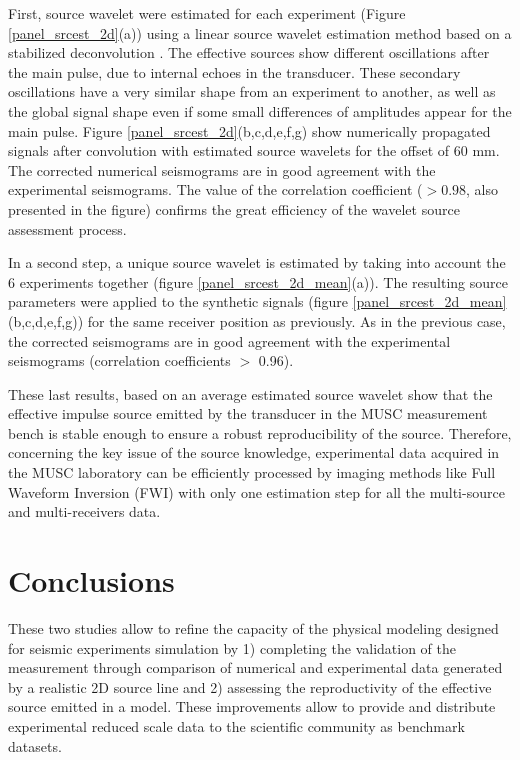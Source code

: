 \documentclass[manuscript,revised]{geophysics}
\begin{document}
\noindent First, source wavelet were estimated for each experiment (Figure \ref{panel_srcest_2d}(a)) using a linear source wavelet estimation method based on a stabilized deconvolution \citep{Pratt_FWI_1999}. The effective sources show different oscillations after the main pulse, due to internal echoes in the transducer. These secondary oscillations have a very similar shape from an experiment to another, as well as the global signal shape even if some small differences of amplitudes appear for the main pulse. Figure \ref{panel_srcest_2d}(b,c,d,e,f,g) show numerically propagated signals after convolution with estimated source wavelets for the offset of 60 mm. The corrected numerical seismograms are in good agreement with the experimental seismograms. The value of the correlation coefficient ($> 0.98$, also presented in the figure) confirms the great efficiency of the wavelet source assessment process.

\noindent In a second step, a unique source wavelet is estimated by taking into account the 6 experiments together (figure \ref{panel_srcest_2d_mean}(a)). The resulting source parameters were applied to the synthetic signals (figure \ref{panel_srcest_2d_mean}(b,c,d,e,f,g)) for the same receiver position as previously. As in the previous case, the corrected seismograms are in good agreement with the experimental seismograms (correlation coefficients $\mathrm{>}$ 0.96).  

\noindent These last results, based on an average estimated source wavelet show that the effective impulse source emitted by the transducer in the MUSC measurement bench is stable enough to ensure a robust reproducibility of the source. Therefore, concerning the key issue of the source knowledge, experimental data acquired in the MUSC laboratory can be efficiently processed by imaging methods like Full Waveform Inversion (FWI) with only one estimation step for all the multi-source and multi-receivers data.


\section{Conclusions}

\noindent These two studies allow to refine the capacity of the physical modeling designed for seismic experiments simulation by 1) completing the validation of the measurement through comparison of numerical and experimental data generated by a realistic 2D source line and 2) assessing the reproductivity of the effective source emitted in a model. These improvements allow to provide and distribute experimental reduced scale data to the scientific community as benchmark datasets.
\end{document}
